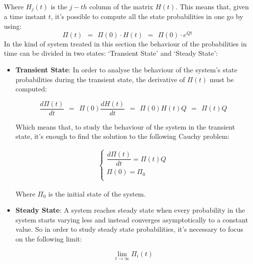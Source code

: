 \documentclass[12pt,a4paper]{article}
\begin{document}
\noindent
Where $H_j(t)$ is the $j-th$ column of the matrix $H(t)$. This means that, given a time instant $t$, it's possible to compute all the state probabilities in one go by using:
$$
\Pi(t)\hspace{5pt}=\hspace{5pt}
\Pi(0)\cdot H(t)\hspace{5pt}=\hspace{5pt}
\Pi(0)\cdot e^{Qt}
$$
In the kind of system treated in this section the behaviour of the probabilities in time can be divided in two states: `Transient State' and `Steady State':
\begin{itemize}
\item \textbf{Transient State}: In order to analyse the behaviour of the system's state probabilities during the transient state, the derivative of $\Pi(t)$ must be computed:

$$
\frac{d\Pi(t)}{dt}
\hspace{5pt}=\hspace{5pt}
\Pi(0)\frac{dH(t)}{dt}
\hspace{5pt}=\hspace{5pt}
\Pi(0)H(t)Q
\hspace{5pt}=\hspace{5pt}
\Pi(t)Q
$$

\noindent
Which means that, to study the behaviour of the system in the transient state, it's enough to find the solution to the following Cauchy problem:

$$
\begin{matrix}
\begin{cases}
\dfrac{d\Pi(t)}{dt}=\Pi(t)Q\\
\Pi(0)=\Pi_0 \\
\end{cases}
\end{matrix}
$$

\noindent
Where $\Pi_0$ is the initial state of the system.
\item \textbf{Steady State}: A system reaches steady state when every probability in the system starts varying less and instead converges asymptotically to a constant value. So in order to study steady state probabilities, it's necessary to focus on the following limit:

$$
\lim_{t\rightarrow \infty}{\Pi_i(t)}
$$
\end{itemize}
\newpage
\end{document}
